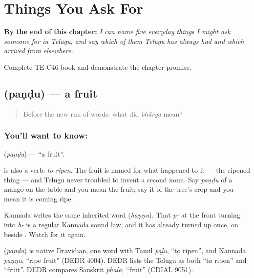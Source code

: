 
\chapter{Things You Ask For}
\label{ch:te-ask-for}

\begin{chapteropening}
\textbf{By the end of this chapter:} \emph{I can name five everyday things I might ask someone for in Telugu, and say which of them Telugu has always had and which arrived from elsewhere.}

Complete TE-C46-book and demonstrate the chapter promise.
\end{chapteropening}

\section[\texorpdfstring{\te{పండు} (paṇḍu)}{పండు (paṇḍu)}]{ (paṇḍu) — a fruit}

\label{lesson:TE-C46-fruit}



\begin{quote}
Before the new run of words: what did \emph{bhārya} mean?
\end{quote}

\subsection*{You'll want to know: }
\textbf{} (\emph{paṇḍu}) — \textquotedblleft{}a fruit\textquotedblright{}.

 is also a verb: \emph{to ripen}. The fruit is named for what happened to it — the ripened thing — and Telugu never troubled to invent a second noun. Say \emph{paṇḍu} of a mango on the table and you mean the fruit; say it of the tree's crop and you mean it is coming ripe.

Kannada writes the same inherited word  (\emph{haṇṇu}). That \emph{p-} at the front turning into \emph{h-} is a regular Kannada sound law, and it has already turned up once, on  beside . Watch for it again.

\begin{cousinweb}
\textbf{} (\emph{paṇḍu}) is native Dravidian, one word with Tamil \emph{paḻu}, \textquotedblleft{}to ripen\textquotedblright{}, and Kannada \emph{paṇṇu}, \textquotedblleft{}ripe fruit\textquotedblright{} (DEDR 4004). DEDR lists the Telugu as both \textquotedblleft{}to ripen\textquotedblright{} and \textquotedblleft{}fruit\textquotedblright{}. DEDR compares Sanskrit \emph{phala}, \textquotedblleft{}fruit\textquotedblright{} (CDIAL 9051).
\end{cousinweb}

